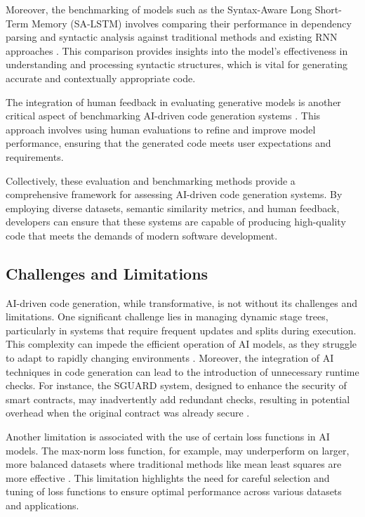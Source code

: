 Moreover, the benchmarking of models such as the Syntax-Aware Long Short-Term Memory (SA-LSTM) involves comparing their performance in dependency parsing and syntactic analysis against traditional methods and existing RNN approaches \cite{qian2017syntaxawarelstmmodel}. This comparison provides insights into the model's effectiveness in understanding and processing syntactic structures, which is vital for generating accurate and contextually appropriate code.



The integration of human feedback in evaluating generative models is another critical aspect of benchmarking AI-driven code generation systems \cite{park2023domainadaptationbasedhuman}. This approach involves using human evaluations to refine and improve model performance, ensuring that the generated code meets user expectations and requirements.



Collectively, these evaluation and benchmarking methods provide a comprehensive framework for assessing AI-driven code generation systems. By employing diverse datasets, semantic similarity metrics, and human feedback, developers can ensure that these systems are capable of producing high-quality code that meets the demands of modern software development.



\subsection{Challenges and Limitations} \label{subsec:Challenges and Limitations}

AI-driven code generation, while transformative, is not without its challenges and limitations. One significant challenge lies in managing dynamic stage trees, particularly in systems that require frequent updates and splits during execution. This complexity can impede the efficient operation of AI models, as they struggle to adapt to rapidly changing environments \cite{shin2020hippotaminghyperparameteroptimization}. Moreover, the integration of AI techniques in code generation can lead to the introduction of unnecessary runtime checks. For instance, the SGUARD system, designed to enhance the security of smart contracts, may inadvertently add redundant checks, resulting in potential overhead when the original contract was already secure \cite{nguyen2021sguardfixingvulnerablesmart}.



Another limitation is associated with the use of certain loss functions in AI models. The max-norm loss function, for example, may underperform on larger, more balanced datasets where traditional methods like mean least squares are more effective \cite{peiris2021deeplearningnonsmoothobjectives}. This limitation highlights the need for careful selection and tuning of loss functions to ensure optimal performance across various datasets and applications.




